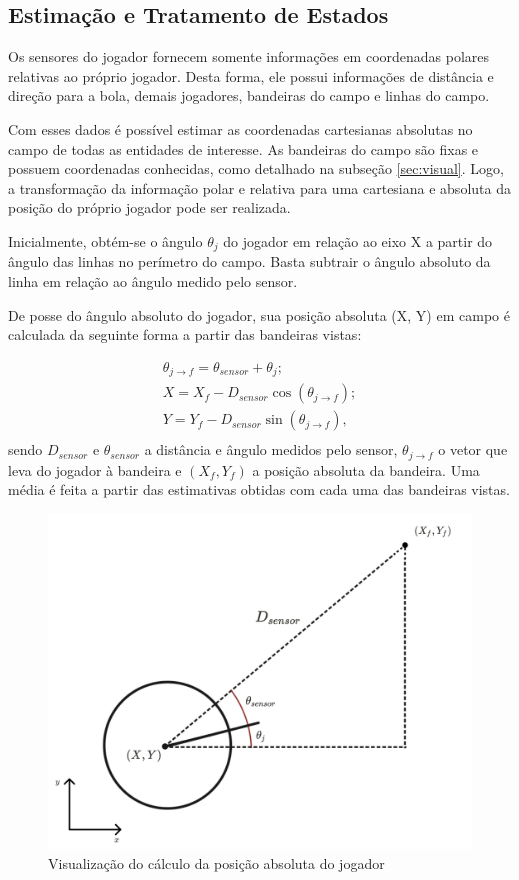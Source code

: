 \subsection{Estimação e Tratamento de Estados}

\par Os sensores do jogador fornecem somente informações em coordenadas polares relativas ao próprio jogador. Desta forma, ele possui informações de distância e direção para a bola, demais jogadores, bandeiras do campo e linhas do campo.

\par Com esses dados é possível estimar as coordenadas cartesianas absolutas no campo de todas as entidades de interesse. As bandeiras do campo são fixas e possuem coordenadas conhecidas, como detalhado na subseção \ref{sec:visual}. Logo, a transformação da informação polar e relativa para uma cartesiana e absoluta da posição do próprio jogador pode ser realizada.

Inicialmente, obtém-se o ângulo $\theta_j$ do jogador em relação ao eixo X a partir do ângulo das linhas no perímetro do campo. Basta subtrair o ângulo absoluto da linha em relação ao ângulo medido pelo sensor.

De posse do ângulo absoluto do jogador, sua posição absoluta (X, Y) em campo é calculada da seguinte forma a partir das bandeiras vistas:

\begin{equation}
	\label{eq:playerpos}
	\begin{array}{ll}
		\theta_{j \to f} = \theta_{sensor} + \theta_j; \\
		X = X_f - D_{sensor} \cos(\theta_{j \to f}); \\
		Y = Y_f - D_{sensor} \sin(\theta_{j \to f}), \\
	\end{array}
\end{equation}
% 
sendo $D_{sensor}$ e $\theta_{sensor}$ a distância e ângulo medidos pelo sensor, $\theta_{j \to f}$ o vetor que leva do jogador à bandeira e $(X_f, Y_f)$ a posição absoluta da bandeira. Uma média é feita a partir das estimativas obtidas com cada uma das bandeiras vistas. 

\begin{figure}[H]
	\includegraphics[width=0.7\linewidth]{figs/trig-transf.png}
	\centering
	\caption{Visualização do cálculo da posição absoluta do jogador}
	\label{fig:trig}
\end{figure}

